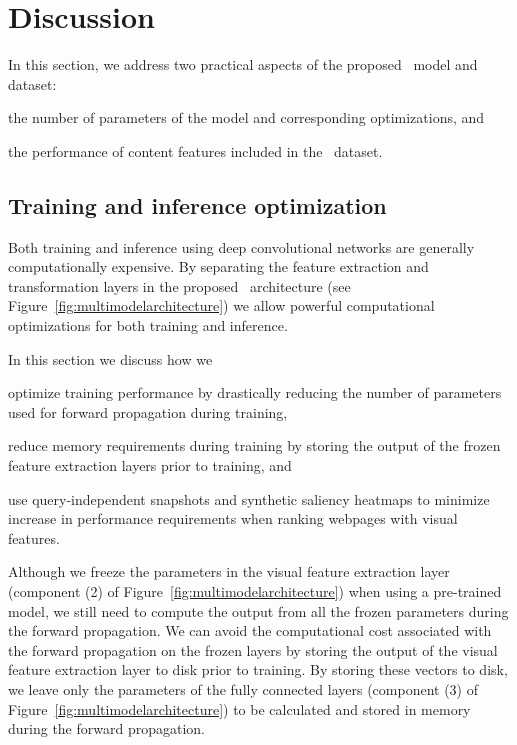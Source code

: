 
\section{Discussion}
\label{sec:discussion}
In this section, we address two practical aspects of the proposed \modelname~model and dataset:
\begin{inparaenum}[(i)]
    \item the number of parameters of the \modelname{} model and corresponding optimizations, and
    \item the performance of content features included in the \datasetname~dataset.
\end{inparaenum}


\subsection{Training and inference optimization} \label{sec:sectionoptimalization}
Both training and inference using deep convolutional networks are generally computationally expensive.
By separating the feature extraction and transformation layers in the proposed \modelname~architecture (see Figure~\ref{fig:multimodelarchitecture}) we allow powerful computational optimizations for both training and inference. 

In this section we discuss how we 
\begin{inparaenum}[(i)]
    \item optimize training performance by drastically reducing the number of parameters used for forward propagation during training, 
    \item reduce memory requirements during training by storing the output of the frozen feature extraction layers prior to training, and
    \item use query-independent snapshots and synthetic saliency heatmaps to minimize increase in performance requirements when ranking webpages with visual features.
\end{inparaenum}
\fi

Although we freeze the parameters in the visual feature extraction layer (component (2) of Figure~\ref{fig:multimodelarchitecture}) when using a pre-trained model, we still need to compute the output from all the frozen parameters during the forward propagation.
We can avoid the computational cost associated with the forward propagation on the frozen layers by storing the output of the visual feature extraction layer to disk prior to training.
By storing these vectors to disk, we leave only the parameters of the fully connected layers (component (3) of Figure~\ref{fig:multimodelarchitecture}) to be calculated and stored in memory during the forward propagation. 

